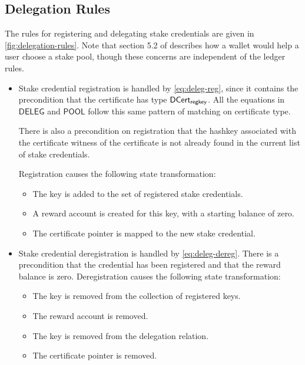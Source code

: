 \subsection{Delegation Rules}
\label{sec:deleg-rules}


The rules for registering and delegating stake credentials are given in
\cref{fig:delegation-rules}.  Note that section 5.2 of \cite{delegation_design}
describes how a wallet would help a user choose a stake pool, though these
concerns are independent of the ledger rules.

\begin{itemize}
\item Stake credential registration is handled by \cref{eq:deleg-reg}, since it
  contains the precondition that the certificate has type $\mathsf{DCert_{regkey}}$.  All
  the equations in $\mathsf{DELEG}$ and $\mathsf{POOL}$ follow this same pattern
  of matching on certificate type.

  There is also a precondition on registration that the hashkey associated with
  the certificate witness of the certificate is not already found in the current
  list of stake credentials.

    Registration causes the following state transformation:
    \begin{itemize}
    \item The key is added to the set of registered stake credentials.
      \item A reward account is created for this key, with a starting balance of zero.
      \item The certificate pointer is mapped to the new stake credential.
    \end{itemize}

  \item Stake credential deregistration is handled by \cref{eq:deleg-dereg}.
    There is a precondition that the credential has been registered and that
    the reward balance is zero.  Deregistration causes the following state
    transformation:
    \begin{itemize}
      \item The key is removed from the collection of registered keys.
      \item The reward account is removed.
      \item The key is removed from the delegation relation.
      \item The certificate pointer is removed.
    \end{itemize}


\end{itemize}
